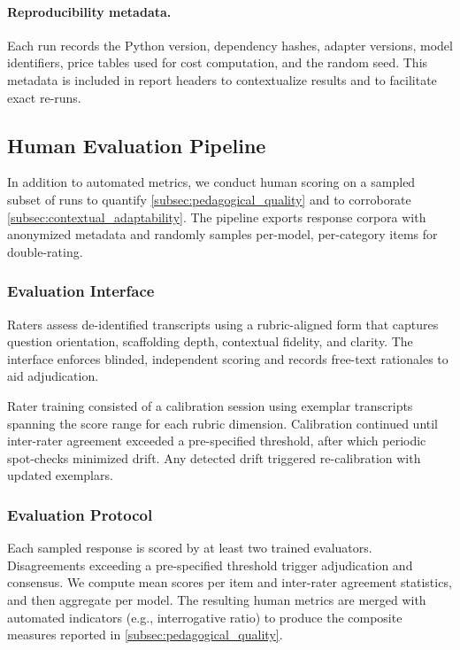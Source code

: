 \paragraph{Reproducibility metadata.} Each run records the Python version, dependency hashes, adapter versions, model identifiers, price tables used for cost computation, and the random seed. This metadata is included in report headers to contextualize results and to facilitate exact re-runs.

\subsection{Human Evaluation Pipeline}
\label{subsec:human_evaluation}

In addition to automated metrics, we conduct human scoring on a sampled subset of runs to quantify \cref{subsec:pedagogical_quality} and to corroborate \cref{subsec:contextual_adaptability}. The pipeline exports response corpora with anonymized metadata and randomly samples per-model, per-category items for double-rating.

\subsubsection{Evaluation Interface}
\label{subsubsec:evaluation_interface}

Raters assess de-identified transcripts using a rubric-aligned form that captures question orientation, scaffolding depth, contextual fidelity, and clarity. The interface enforces blinded, independent scoring and records free-text rationales to aid adjudication.

Rater training consisted of a calibration session using exemplar transcripts spanning the score range for each rubric dimension. Calibration continued until inter-rater agreement exceeded a pre-specified threshold, after which periodic spot-checks minimized drift. Any detected drift triggered re-calibration with updated exemplars.

\subsubsection{Evaluation Protocol}
\label{subsubsec:evaluation_protocol}

Each sampled response is scored by at least two trained evaluators. Disagreements exceeding a pre-specified threshold trigger adjudication and consensus. We compute mean scores per item and inter-rater agreement statistics, and then aggregate per model. The resulting human metrics are merged with automated indicators (e.g., interrogative ratio) to produce the composite measures reported in \cref{subsec:pedagogical_quality}.

